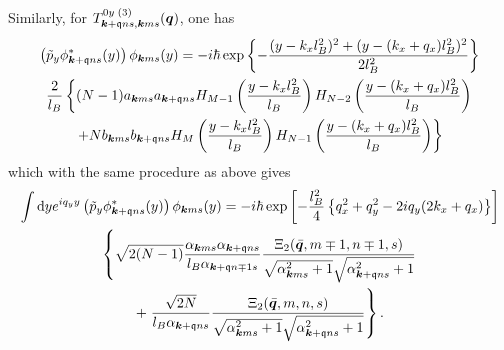 %
Similarly, for $T^{0y\; (3)}_{\bm{k}+\mathfrak{q}ns, \bm{k}ms} (\bm{q})$, one has
\begin{multline}
  \left( \tilde{p}_y \phi ^{*}_{\bm{k}+\mathfrak{q} ns}(y) \right)
  \phi _{\bm{k} m s}(y) = 
  -i \hbar \exp \left\{
    - \frac{(y-k_xl_B^2)^2 + (y-(k_x + q_x) l_B^2)^2}{2 l_B^2}
  \right\}\\
  \frac{2}{l_{B}} \left\{
    (N-1) a_{\bm{k} m s} a_{\bm{k} + \mathfrak{q} n s} H_{M-1} \left( \frac{y-k_xl_B^2}{l_B} \right)H_{N-2} \left( \frac{y - (k_x + q_x) l_B^2}{l_B} \right) \right.\\
  \left. +
    N b_{\bm{k} m s} b_{\bm{k}+\mathfrak{q} n s} H_M \left( \frac{y - k_xl_B^2}{l_B} \right) H_{N-1}\left( \frac{y-(k_x+q_x) l_B^2}{l_B} \right)
  \right\}
\end{multline}
which with the same procedure as above gives
\begin{multline}
  \int \mathrm{d}y e^{iq_y y}
  \left( \tilde{p}_y \phi ^{*}_{\bm{k}+\mathfrak{q} ns}(y) \right)
  \phi _{\bm{k} m s}(y) 
  =
  -i\hbar 
  \exp \left[ -\frac{l_B^2}{4} \left\{ q_x^2 + q_y^2 - 2iq_y ( 2k_x + q_x) \right\} \right]\\
  \left\{
    \sqrt{2(N-1)}
    \frac{\alpha _{\bm{k} m s} \alpha _{\bm{k} + \mathfrak{q} n s}}{ l_B \alpha _{\bm{k} + \mathfrak{q} n\mp 1 s}}
    \frac{\Xi _2(\bar{\bm{q}}, m\mp 1, n\mp 1, s)}{
      \sqrt{\alpha _{\bm{k} m s}^2 + 1} \sqrt{\alpha _{\bm{k}+\mathfrak{q} n s}^2 + 1} 
    }\right.\\
    +\left.
    \frac{\sqrt{2 N} }{ l_B \alpha _{\bm{k} + \mathfrak{q} n s}}
    \frac{\Xi _2(\bar{\bm{q}}, m, n, s)}{
      \sqrt{\alpha _{\bm{k} m s}^2 + 1} \sqrt{\alpha _{\bm{k}+\mathfrak{q} n s}^2 + 1} 
    }
  \right\}.
\end{multline}

